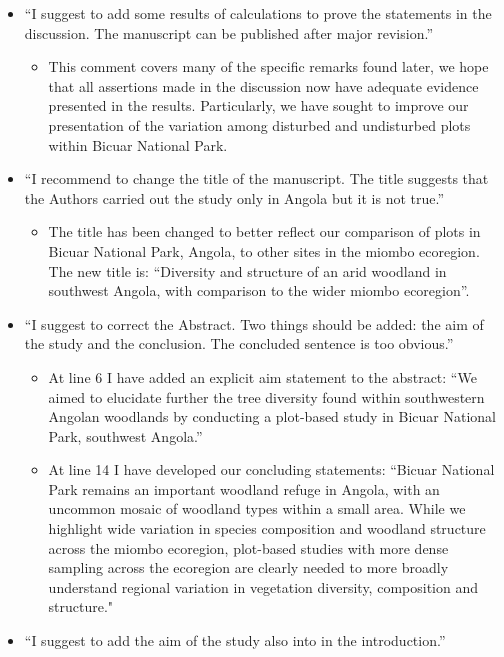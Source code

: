 \documentclass[a4paper]{letter}
\begin{document}
\begin{letter}{}
\begin{itemize}
	\item{``I suggest to add some results of calculations to prove the statements in the discussion.  The manuscript can be published after major revision.''}
		\begin{itemize}
			\item{This comment covers many of the specific remarks found later, we hope that all assertions made in the discussion now have adequate evidence presented in the results. Particularly, we have sought to improve our presentation of the variation among disturbed and undisturbed plots within Bicuar National Park.}
		\end{itemize}
	\item{``I recommend to change the title of the manuscript. The title suggests that the Authors carried out the study only in Angola but it is not true.''}
		\begin{itemize}
			\item{The title has been changed to better reflect our comparison of plots in Bicuar National Park, Angola, to other sites in the miombo ecoregion. The new title is: ``Diversity and structure of an arid woodland in southwest Angola, with comparison to the wider miombo ecoregion''.}
		\end{itemize}
	\item{``I suggest to correct the Abstract. Two things should be added: the aim of the study and the conclusion. The concluded sentence is too obvious.''}
		\begin{itemize}
			\item{At line 6 I have added an explicit aim statement to the abstract: ``We aimed to elucidate further the tree diversity found within southwestern Angolan woodlands by conducting a plot-based study in Bicuar National Park, southwest Angola.''}
			\item{At line 14 I have developed our concluding statements: ``Bicuar National Park remains an important woodland refuge in Angola, with an uncommon mosaic of woodland types within a small area. While we highlight wide variation in species composition and woodland structure across the miombo ecoregion, plot-based studies with more dense sampling across the ecoregion are clearly needed to more broadly understand regional variation in vegetation diversity, composition and structure."}
		\end{itemize}
	\item{``I suggest to add the aim of the study also into in the introduction.''}

\end{itemize}
\end{letter}
\end{document}
